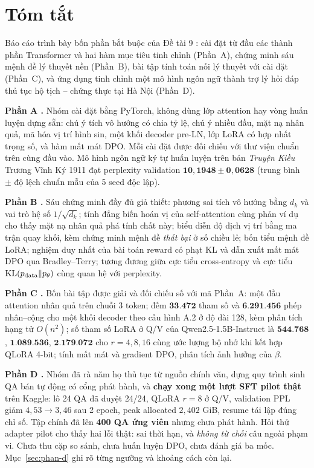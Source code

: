 \section*{Tóm tắt}

Báo cáo trình bày bốn phần bắt buộc của Đề tài 9 \cite{de}: cài đặt từ đầu các
thành phần Transformer và hai hàm mục tiêu tinh chỉnh (Phần~A), chứng minh sáu
mệnh đề lý thuyết nền (Phần~B), bài tập tính toán nối lý thuyết với cài đặt
(Phần~C), và ứng dụng tinh chỉnh một mô hình ngôn ngữ thành trợ lý hỏi đáp thủ
tục hộ tịch -- chứng thực tại Hà Nội (Phần~D).

\textbf{Phần A \dalam.} Nhóm cài đặt bằng PyTorch, không dùng lớp attention hay
vòng huấn luyện dựng sẵn: chú ý tích vô hướng có chia tỷ lệ, chú ý nhiều đầu,
mặt nạ nhân quả, mã hóa vị trí hình sin, một khối decoder pre-LN, lớp LoRA có
hợp nhất trọng số, và hàm mất mát DPO. Mỗi cài đặt được đối chiếu với thư viện
chuẩn trên cùng đầu vào. Mô hình ngôn ngữ ký tự huấn luyện trên bản
\emph{Truyện Kiều} Trương Vĩnh Ký 1911 đạt perplexity validation
$\mathbf{10{,}1948 \pm 0{,}0628}$ (trung bình $\pm$ độ lệch chuẩn mẫu của 5 seed
độc lập).

\textbf{Phần B \dalam.} Sáu chứng minh đầy đủ giả thiết: phương sai tích vô hướng
bằng $d_k$ và vai trò hệ số $1/\sqrt{d_k}$; tính đẳng biến hoán vị của
self-attention cùng phản ví dụ cho thấy mặt nạ nhân quả phá tính chất này; biểu
diễn độ dịch vị trí bằng ma trận quay khối, kèm chứng minh mệnh đề \emph{thất bại}
ở số chiều lẻ; bốn tiểu mệnh đề LoRA; nghiệm duy nhất của bài toán reward có phạt
KL và dẫn xuất mất mát DPO qua Bradley--Terry; tương đương giữa cực tiểu
cross-entropy và cực tiểu $\operatorname{KL}(p_{\mathrm{data}}\|p_\theta)$ cùng quan hệ với perplexity.

\textbf{Phần C \dalam.} Bốn bài tập được giải và đối chiếu số với mã Phần~A: một
đầu attention nhân quả trên chuỗi 3 token; đếm $\mathbf{33{.}472}$ tham số và
$\mathbf{6{.}291{.}456}$ phép nhân--cộng cho một khối decoder theo cấu hình A.2 ở
độ dài 128, kèm phân tích hạng tử $O(n^2)$; số tham số LoRA ở Q/V của
Qwen2.5-1.5B-Instruct là $\mathbf{544{.}768}$, $\mathbf{1{.}089{.}536}$,
$\mathbf{2{.}179{.}072}$ cho $r=4,8,16$ cùng ước lượng bộ nhớ khi kết hợp QLoRA
4-bit; tính mất mát và gradient DPO, phân tích ảnh hưởng của $\beta$.

\textbf{Phần D \motphan.} Nhóm đã rà năm họ thủ tục từ nguồn chính văn, dựng quy
trình sinh QA bán tự động có cổng phát hành, và \textbf{chạy xong một lượt SFT
pilot thật} trên Kaggle: lô 24 QA đã duyệt 24/24, QLoRA $r=8$ ở Q/V, validation
PPL giảm $4{,}53\to3{,}46$ sau 2 epoch, peak allocated $2{,}402$ GiB, resume tái
lập đúng chỉ số. Tập chính đã lên \textbf{400 QA ứng viên} nhưng chưa phát hành.
Hỏi thử adapter pilot cho thấy hai lỗi thật: sai thời hạn, và \emph{không từ chối}
câu ngoài phạm vi. Chưa thu cặp so sánh, chưa huấn luyện DPO, chưa đánh giá ba mốc.
Mục~\ref{sec:phan-d} ghi rõ từng ngưỡng và khoảng cách còn lại.

